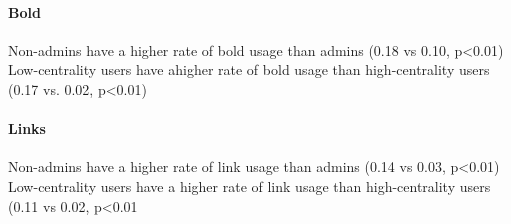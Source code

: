 \documentclass[12pt]{scrartcl}
\begin{document}
\paragraph{Bold}
Non-admins have a higher rate of bold usage than admins (0.18 vs 0.10, p<0.01)
Low-centrality users have ahigher rate of bold usage than high-centrality users (0.17 vs. 0.02, p<0.01)

\paragraph{Links}
Non-admins have a higher rate of link usage than admins (0.14 vs 0.03, p<0.01)
Low-centrality users have a higher rate of link usage than high-centrality users (0.11 vs 0.02, p<0.01



\end{document}

